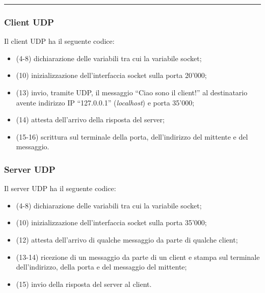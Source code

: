 \documentclass[a4paper]{article}
\newcommand{\longline}{\noindent\rule{\textwidth}{0.4pt}}
\newcommand{\dquotes}[1]{``#1''}
\begin{document}
	\longline
	
	\subsubsection{Client UDP}\label{client UDP}
	
	Il client UDP ha il seguente codice:
	
	\begin{itemize}
		\item (4-8) dichiarazione delle variabili tra cui la variabile socket;
	
		\item (10) inizializzazione dell'interfaccia socket sulla porta 20'000;
	
		\item (13) invio, tramite UDP, il messaggio \dquotes{Ciao sono il client!} al destinatario avente indirizzo IP \dquotes{127.0.0.1} (\emph{localhost}) e porta 35'000;
	
		\item (14) attesta dell'arrivo della risposta del server;
		
		\item (15-16) scrittura sul terminale della porta, dell'indirizzo del mittente e del messaggio.
	\end{itemize}\newpage
	
	\subsubsection{Server UDP}\label{server UDP}
	
	Il server UDP ha il seguente codice:
	
	\begin{itemize}
		\item (4-8) dichiarazione delle variabili tra cui la variabile socket;
		
		\item (10) inizializzazione dell'interfaccia socket sulla porta 35'000;
		
		\item (12) attesta dell'arrivo di qualche messaggio da parte di qualche client;
		
		\item (13-14) ricezione di un messaggio da parte di un client e stampa sul terminale dell'indirizzo, della porta e del messaggio del mittente;
		
		\item (15) invio della risposta del server al client.
	\end{itemize}\newpage
\end{document}

